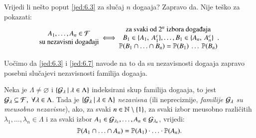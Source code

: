 Vrijedi li ne\v sto poput \eqref{jed:6.3} za slu\v caj $n$ doga\dj aja?
Zapravo da. Nije te\v sko za pokazati:
\begin{equation}    \label{jed:6.7}
    \begin{matrix}
        A_1, \ldots, A_n \in \famF\\
        \textnormal{su nezavisni doga\dj aji}
    \end{matrix}
    \iff
    \begin{matrix}
        \textnormal{za svaki od $2^n$ izbora doga\dj aja}\\
        B_1 \in \{A_1, \: A_1^c\}, \ldots, B_1 \in \{A_n, \: A_n^c\}\\
        \vjeroj{B_1 \cap \ldots \cap B_n} = \vjeroj{B_1} \: \ldots \: \vjeroj{B_n}
    \end{matrix}
    .
\end{equation}

Uo\v cimo da \eqref{jed:6.3} i \eqref{jed:6.7} navode na to da su nezavisnosti doga\dj aja zapravo posebni slu\v cajevi nezavisnosti familija doga\dj aja.

\begin{defn}    \label{defn:6.8}
    Neka je $\Lambda \neq \varnothing$ i $\{{\mathcal{G}_\lambda} \: | \: {\lambda \in \Lambda}\}$ indeksirani skup familija doga\dj aja, to jest $\mathcal{G}_\lambda \subseteq \mathcal{F}, \; \forall \lambda \in \Lambda$.
    Tada je $\{{\mathcal{G}_\lambda} \: | \: {\lambda \in \Lambda}\}$ \emph{nezavisna} (ili nepreciznije, \emph{familije} $\mathcal{G}_\lambda$ \emph{su me\dj usobno nezavisne}), ako, za svaki $n \in \mathbb{N} \setminus \{1\}$, za svaki izbor me\dj usobno razli\v citih $\lambda_1, \ldots, \lambda_n \in \Lambda$ i za svaki izbor $A_1 \in \mathcal{G}_{\lambda_1}, \ldots, A_n \in \mathcal{G}_{\lambda_n}$, vrijedi:
    \begin{equation*}
        \mathbb{P}({A_1 \cap \ldots \cap A_n}) = \mathbb{P}({A_1}) \cdot \ldots \cdot \mathbb{P}({A_n}).
    \end{equation*}
\end{defn}

